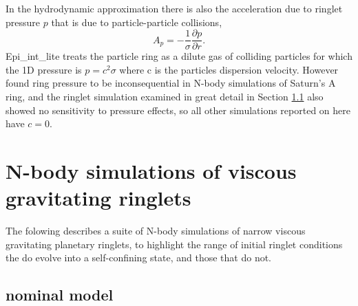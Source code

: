 \documentclass[preprint]{aastex62}
\begin{document}
In the hydrodynamic approximation there is also the acceleration due to ringlet pressure $p$
that is due to particle-particle collisions,
\begin{equation}
\label{eqn:pressure}
    A_p=-\frac{1}{\sigma }\frac{\partial p}{\partial r}.
\end{equation}
Epi\_int\_lite treats the particle ring as a dilute gas of
colliding particles for which the 1D pressure is $p=c^2\sigma$ where
c is the particles dispersion velocity. However \cite{HS13} found ring pressure
to be inconsequential in N-body simulations of Saturn's A ring, and the ringlet simulation
examined in great detail in Section \ref{subsec:nominal} 
also showed no sensitivity to pressure effects, so all other
simulations reported on here have $c=0$.

\section{N-body simulations of viscous gravitating ringlets}
\label{sec:nbody}

The folowing describes a suite of N-body simulations of narrow viscous gravitating planetary
ringlets, to highlight the range of initial ringlet conditions the do evolve into
a self-confining state, and those that do not.

\subsection{nominal model}
\label{subsec:nominal}
\end{document}
